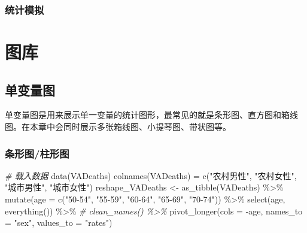 \documentclass[
  lang=cn,
  11pt,
  scheme=chinese,
  chinesefont=nofont,
  citestyle=gb7714-2015,
  bibstyle=gb7714-2015]{elegantbook}
\newenvironment{Shaded}{\begin{snugshade}}{\end{snugshade}}
\newcommand{\AttributeTok}[1]{\textcolor[rgb]{0.77,0.63,0.00}{#1}}
\newcommand{\CommentTok}[1]{\textcolor[rgb]{0.56,0.35,0.01}{\textit{#1}}}
\newcommand{\FunctionTok}[1]{\textcolor[rgb]{0.00,0.00,0.00}{#1}}
\newcommand{\NormalTok}[1]{#1}
\newcommand{\OtherTok}[1]{\textcolor[rgb]{0.56,0.35,0.01}{#1}}
\newcommand{\SpecialCharTok}[1]{\textcolor[rgb]{0.00,0.00,0.00}{#1}}
\newcommand{\StringTok}[1]{\textcolor[rgb]{0.31,0.60,0.02}{#1}}
\begin{document}
\hypertarget{ux7edfux8ba1ux6a21ux62df}{%
\section{统计模拟}\label{ux7edfux8ba1ux6a21ux62df}}

\hypertarget{part-ux56feux5e93}{%
\part{图库}\label{part-ux56feux5e93}}

\hypertarget{single-variable-fig}{%
\chapter{单变量图}\label{single-variable-fig}}

单变量图是用来展示单一变量的统计图形，最常见的就是条形图、直方图和箱线图。在本章中会同时展示多张箱线图、小提琴图、带状图等。

\hypertarget{sec:bar-plot}{%
\section{条形图/柱形图}\label{sec:bar-plot}}

\begin{Shaded}
\begin{Highlighting}[]
\CommentTok{\# 载入数据}
\FunctionTok{data}\NormalTok{(VADeaths)}
\FunctionTok{colnames}\NormalTok{(VADeaths) }\OtherTok{=} \FunctionTok{c}\NormalTok{(}\StringTok{"农村男性"}\NormalTok{, }\StringTok{"农村女性"}\NormalTok{, }\StringTok{"城市男性"}\NormalTok{, }\StringTok{"城市女性"}\NormalTok{)}
\NormalTok{reshape\_VADeaths }\OtherTok{\textless{}{-}} \FunctionTok{as\_tibble}\NormalTok{(VADeaths) }\SpecialCharTok{\%\textgreater{}\%} 
  \FunctionTok{mutate}\NormalTok{(}\AttributeTok{age =} \FunctionTok{c}\NormalTok{(}\StringTok{"50{-}54"}\NormalTok{, }\StringTok{"55{-}59"}\NormalTok{, }\StringTok{"60{-}64"}\NormalTok{, }\StringTok{"65{-}69"}\NormalTok{, }\StringTok{"70{-}74"}\NormalTok{)) }\SpecialCharTok{\%\textgreater{}\%} 
  \FunctionTok{select}\NormalTok{(age, }\FunctionTok{everything}\NormalTok{()) }\SpecialCharTok{\%\textgreater{}\%} 
  \CommentTok{\# clean\_names() \%\textgreater{}\% }
  \FunctionTok{pivot\_longer}\NormalTok{(}\AttributeTok{cols =} \SpecialCharTok{{-}}\NormalTok{age,}
               \AttributeTok{names\_to =} \StringTok{"sex"}\NormalTok{,}
               \AttributeTok{values\_to =} \StringTok{"rates"}\NormalTok{)}
\end{Highlighting}
\end{Shaded}
\end{document}
